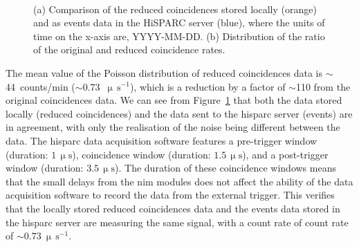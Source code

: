 \begin{figure}[ht!]
	\centering
	 \\
	
	\caption{(a) Comparison of the reduced coincidences stored locally (orange) and as events data in the HiSPARC server (blue), where the units of time on the x-axis are, YYYY-MM-DD. (b) Distribution of the ratio of the original and reduced coincidence rates.}
	\label{fig:reduced_coincidences}
\end{figure}

The mean value of the Poisson distribution of reduced coincidences data is $\sim$44~counts/min ($\sim$0.73~$\upmu \, \mathrm{s}^{-1}$), which is a reduction by a factor of $\sim$110 from the original coincidences data. We can see from Figure~\ref{fig:reduced_coincidences} that both the data stored locally (reduced coincidences) and the data sent to the \gls{hisparc} server (events) are in agreement, with only the realisation of the noise being different between the data. The \gls{hisparc} data acquisition software features a pre-trigger window (duration: $1 \, \upmu\mathrm{s}$), coincidence window (duration: $1.5 \, \upmu\mathrm{s}$), and a post-trigger window (duration: $3.5 \, \upmu\mathrm{s}$). The duration of these coincidence windows means that the small delays from the \gls{nim} modules does not affect the ability of the data acquisition software to record the data from the external trigger. This verifies that the locally stored reduced coincidences data and the events data stored in the \gls{hisparc} server are measuring the same signal, with a count rate of count rate of $\sim 0.73~\upmu \, \mathrm{s}^{-1}$.



